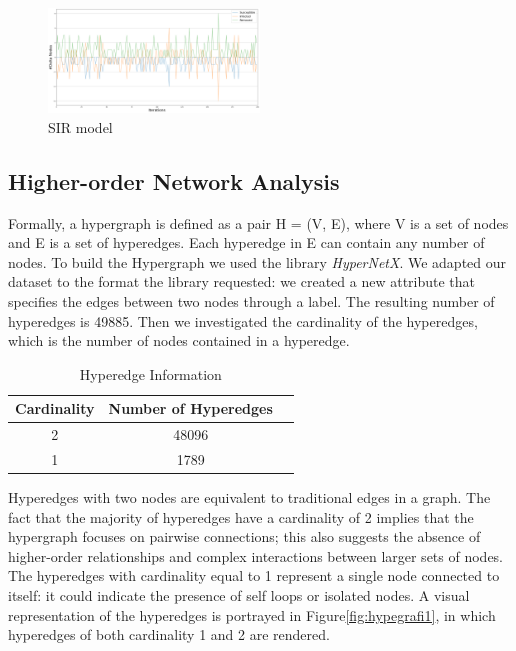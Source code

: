 \documentclass[sigchi]{acmart}
\begin{document}
\begin{figure}[H]
  \centering
  \includegraphics[width=0.50\textwidth]{SIR.png}
  \caption{SIR model}
  \label{fig:immagine_sir}
\end{figure}


\subsection{Higher-order Network Analysis}

Formally, a hypergraph is defined as a pair H = (V, E), where V is a set of nodes and E is a set of hyperedges. Each hyperedge in E can contain any number of nodes. To build the Hypergraph we used the library \textit{HyperNetX}\cite{doecode_22160}. We adapted our dataset to the format the library requested: we created a new attribute that specifies the edges between two nodes through a label. The resulting number of hyperedges is 49885. Then we investigated the cardinality of the hyperedges, which is the number of nodes contained in a hyperedge. 

\begin{table}[htbp]
\centering
\caption{Hyperedge Information}
\begin{tabular}{ccr}
\toprule
Cardinality & Number of Hyperedges \\
\midrule
2 & 48096 \\
1 & 1789 \\
\bottomrule
\end{tabular}
\end{table}


Hyperedges with two nodes are equivalent to traditional edges in a graph. The fact that the majority of hyperedges have a cardinality of 2 implies that the hypergraph focuses on pairwise connections; this also suggests the absence of higher-order relationships and complex interactions between larger sets of nodes. 
The hyperedges with cardinality equal to 1 represent a single node connected to itself: it could indicate the presence of self loops or isolated nodes. A visual representation of the hyperedges is portrayed in Figure\ref{fig:hypegrafi1}, in which hyperedges of both cardinality 1 and 2 are rendered.
\end{document}
